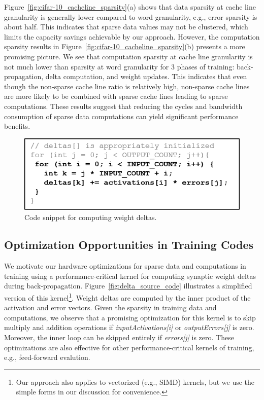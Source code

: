 Figure~\ref{fig:cifar-10_cacheline_sparsity}(a) shows that data sparsity at cache line granularity is generally lower compared to word granularity, e.g., error sparsity is about half.  This indicates that sparse data values may not be clustered, which limits the capacity savings achievable by our approach.  However, the computation sparsity results in Figure~\ref{fig:cifar-10_cacheline_sparsity}(b) presents a more promising picture. We see that computation sparsity at cache line granularity is not much lower than sparsity at word granularity for $3$ phases of training: back-propagation, delta computation, and weight updates. This indicates that even though the non-sparse cache line ratio is relatively high, non-sparse cache lines are more likely to be combined with sparse cache lines leading to sparse computations. These results suggest that reducing the cycles and bandwidth consumption of sparse data computations can yield significant performance benefits. 

\begin{figure}
 \centering
 \includegraphics[width=.9\columnwidth]{Figures/deltas_source_code.png}
\caption{Code snippet for computing weight deltas.}
 \label{fig:deltas_source_code}
 \end{figure}

\subsection{Optimization Opportunities in Training Codes}
\label{subsec:sparse_code_oppor}
We motivate our hardware optimizations for sparse data and computations in training using a performance-critical kernel for computing synaptic weight deltas during back-propagation.  Figure~\ref{fig:delta_source_code} illustrates a simplified version of this kernel\footnote{Our approach also applies to vectorized (e.g., SIMD) kernels, but we use the simple forms in our discussion for convenience.}.   Weight deltas are computed by the inner product of the activation and error vectors.  Given the sparsity in training data and computations, we observe that a promising optimization for this kernel is to skip multiply and addition operations if \emph{inputActivations[i]} or \emph{outputErrors[j]} is zero.  Moreover, the inner loop can be skipped entirely if \emph{errors[j]} is zero.  These optimizations are also effective for other performance-critical kernels of training, e.g., feed-forward evalution. 

